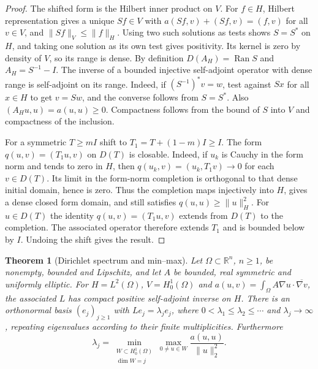 \documentclass[11pt,oneside,openany]{book}
\theoremstyle{plain}
\newtheorem{theorem}{Theorem}[chapter]
\theoremstyle{definition}
\theoremstyle{remark}
\begin{document}
\begin{proof}
The shifted form is the Hilbert inner product on \(V\).
For \(f\in H\), Hilbert representation gives a unique \(Sf\in V\)
with \(a(Sf,v)+(Sf,v)=(f,v)\) for all \(v\in V\), and
\(\|Sf\|_V\leq\|f\|_H\). Using two such solutions as tests
shows \(S=S^*\) on \(H\), and taking one solution as its own
test gives positivity. Its kernel is zero by density of \(V\),
so its range is dense. By definition
\(D(A_H)=\operatorname{Ran}S\) and \(A_H=S^{-1}-I\).
The inverse of a bounded injective self-adjoint operator with
dense range is self-adjoint on its range. Indeed, if
\((S^{-1})^*v=w\), test against \(Sx\) for all \(x\in H\)
to get \(v=Sw\), and the converse follows from \(S=S^*\).
Also \((A_Hu,u)=a(u,u)\geq0\). Compactness follows from the
bound of \(S\) into \(V\) and compactness of the inclusion.

For a symmetric \(T\geq mI\) shift to \(T_1=T+(1-m)I\geq I\).
The form \(q(u,v)=(T_1u,v)\) on \(D(T)\) is closable.
Indeed, if \(u_k\) is Cauchy in the form norm and tends
to zero in \(H\), then \(q(u_k,v)=(u_k,T_1v)\to0\) for each
\(v\in D(T)\). Its limit in the form-norm completion is
orthogonal to that dense initial domain, hence is zero.
Thus the completion maps injectively into \(H\), gives a
dense closed form domain, and still satisfies
\(q(u,u)\geq\|u\|_H^2\). For \(u\in D(T)\) the identity
\(q(u,v)=(T_1u,v)\) extends from \(D(T)\) to the completion.
The associated operator therefore extends \(T_1\) and is
bounded below by \(I\). Undoing the shift gives the result.
\end{proof}

\begin{theorem}[Dirichlet spectrum and min--max]
\label{pde:elliptic-dirichlet-spectrum}
Let \(\Omega\subset\mathbb R^n\), \(n\geq1\), be nonempty,
bounded and Lipschitz, and let \(A\) be bounded, real symmetric
and uniformly elliptic. For \(H=L^2(\Omega)\), \(V=H_0^1(\Omega)\)
and \(a(u,v)=\int_\Omega A\nabla u\cdot\overline{\nabla v}\),
the associated \(L\) has compact positive self-adjoint inverse
on \(H\). There is an orthonormal basis \((e_j)_{j\geq1}\)
with \(Le_j=\lambda_j e_j\), where
\(0<\lambda_1\leq\lambda_2\leq\cdots\) and
\(\lambda_j\to\infty\), repeating eigenvalues according to
their finite multiplicities. Furthermore
\[
 \lambda_j=\min_{\substack{W\subset H_0^1(\Omega)\\ \dim W=j}}
                  \max_{0\ne u\in W}\frac{a(u,u)}{\|u\|_2^2}.
\]
\end{theorem}
\end{document}
